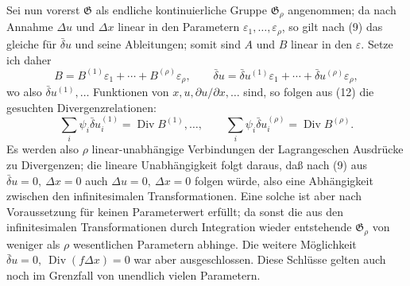 \documentclass[11pt]{article}
\newcommand{\D}{\Delta}
\providecommand{\eps}{\varepsilon}
\providecommand{\Div}{\operatorname{Div}}
\providecommand{\G}{\mathfrak G}
\providecommand{\bd}{\bar{\delta}}
\providecommand{\p}{\partial}
\providecommand{\p}{\partial}
\begin{document}
Sei nun vorerst \(\G\) als endliche kontinuierliche Gruppe \(\G_\rho\) angenommen; da nach Annahme \(\D u\) und \(\D x\) linear in den Parametern \(\eps_1,\ldots,\eps_\rho\), so gilt nach (9) das gleiche für \(\bd u\) und seine Ableitungen; somit sind \(A\) und \(B\) linear in den \(\eps\). Setze ich daher
\[
B=B^{(1)}\eps_1+\cdots+B^{(\rho)}\eps_\rho,\qquad
\bd u=\bd u^{(1)}\eps_1+\cdots+\bd u^{(\rho)}\eps_\rho,
\]
wo also \(\bd u^{(1)},\ldots\) Funktionen von \(x,u,\p u/\p x,\ldots\) sind, so folgen aus (12) die gesuchten Divergenzrelationen:
\begin{equation}
\sum_i\psi_i\bd u_i^{(1)}=\Div B^{(1)},\ldots,\qquad
\sum_i\psi_i\bd u_i^{(\rho)}=\Div B^{(\rho)}.
\tag{13}
\end{equation}
Es werden also \(\rho\) linear-unabhängige Verbindungen der Lagrangeschen Ausdrücke zu Divergenzen; die lineare Unabhängigkeit folgt daraus, daß nach (9) aus \(\bd u=0,\ \D x=0\) auch \(\D u=0,\ \D x=0\) folgen würde, also eine Abhängigkeit zwischen den infinitesimalen Transformationen. Eine solche ist aber nach Voraussetzung für keinen Parameterwert erfüllt; da sonst die aus den infinitesimalen Transformationen durch Integration wieder entstehende \(\G_\rho\) von weniger als \(\rho\) wesentlichen Parametern abhinge. Die weitere Möglichkeit \(\bd u=0,\ \Div(f\D x)=0\) war aber ausgeschlossen. Diese Schlüsse gelten auch noch im Grenzfall von unendlich vielen Parametern.
\end{document}
